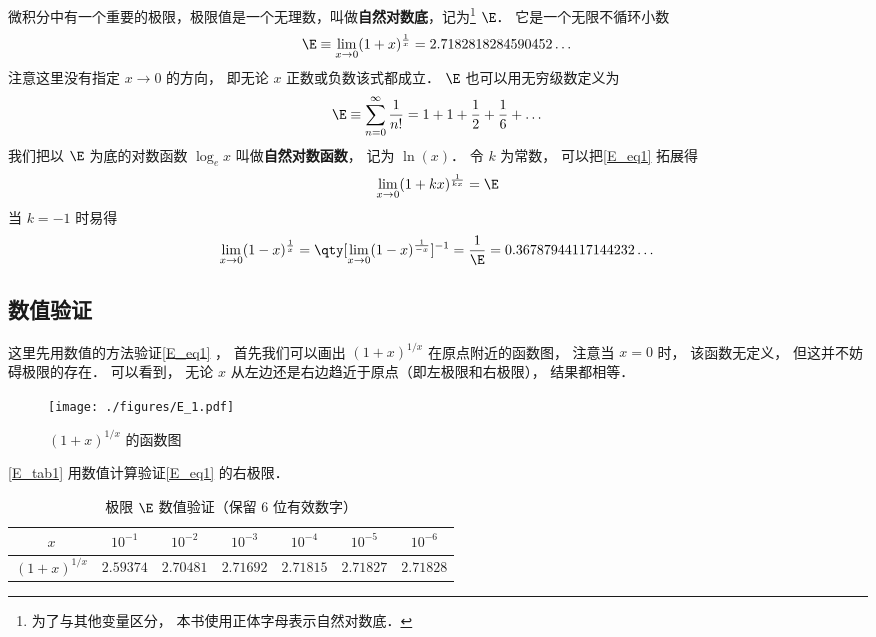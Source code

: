 
微积分中有一个重要的极限，极限值是一个无理数，叫做\textbf{自然对数底}，记为\footnote{为了与其他变量区分， 本书使用正体字母表示自然对数底．} $\E$． 它是一个无限不循环小数
\begin{equation}\label{E_eq1}
\E \equiv \lim_{x \to 0} (1 + x)^{\frac{1}{x}} = 2.7182818284590452\dots
\end{equation}
注意这里没有指定 $x\to 0$ 的方向， 即无论 $x$ 正数或负数该式都成立． $\E$ 也可以用无穷级数定义为
\begin{equation}\label{E_eq2}
\E \equiv \sum_{n=0}^\infty \frac{1}{n!} = 1 + 1 + \frac{1}{2} + \frac{1}{6} + \dots
\end{equation}
我们把以 $\E$ 为底的对数函数 $\log_e x$ 叫做\textbf{自然对数函数}， 记为 $\ln(x)$．
令 $k$ 为常数， 可以把\autoref{E_eq1} 拓展得
\begin{equation}\label{E_eq4}
\lim_{x \to 0} (1 + kx)^{\frac{1}{kx}} = \E
\end{equation}
当 $k = -1$ 时易得
\begin{equation}\label{E_eq3}
\lim_{x \to 0} (1 - x)^{\frac{1}{x}} = \qty[\lim_{x \to 0} (1 - x)^{\frac{1}{-x}}]^{-1} = \frac{1}{\E} = 0.36787944117144232\dots
\end{equation}

\subsection{数值验证}
这里先用数值的方法验证\autoref{E_eq1} ， 首先我们可以画出 $(1+x)^{1/x}$ 在原点附近的函数图， 注意当 $x = 0$ 时， 该函数无定义， 但这并不妨碍极限的存在． 可以看到， 无论 $x$ 从左边还是右边趋近于原点（即左极限和右极限）， 结果都相等．
\begin{figure}[ht]
\centering
\texttt{[image: ./figures/E\_1.pdf]}
\caption{$(1+x)^{1/x}$ 的函数图} \label{E_fig1}
\end{figure}

\autoref{E_tab1} 用数值计算验证\autoref{E_eq1} 的右极限．
\begin{table}[ht]
\centering
\caption{极限 $\E$ 数值验证（保留 6 位有效数字）}\label{E_tab1}
\begin{tabular}{|c|c|c|c|c|c|c|}
\hline
$x$ & $10^{-1}$ & $10^{-2}$ & $10^{-3}$ & $10^{-4}$ & $10^{-5}$ & $10^{-6}$ \\
\hline
$(1 + x)^{1/x}$ & $2.59374$ & $2.70481$ & $2.71692$ & $2.71815$ & $2.71827$ & $2.71828$ \\
\hline
\end{tabular}
\end{table}


